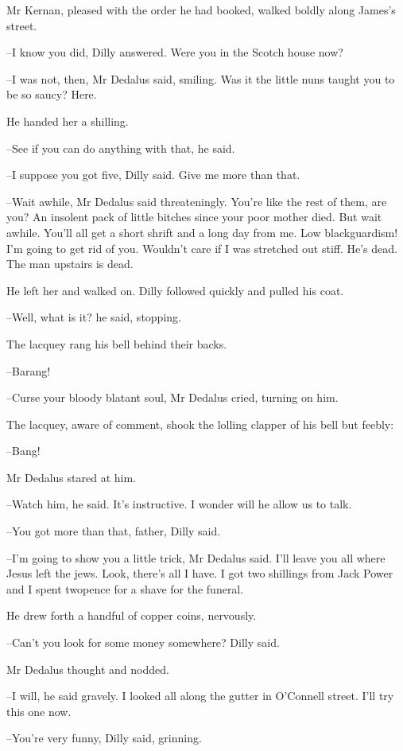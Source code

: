 Mr Kernan,
pleased with the order he had booked,
walked boldly
along James's street.

--I know you did,
Dilly answered.
Were you in the Scotch house now?

--I was not, then,
Mr Dedalus said, smiling.
Was it the little nuns
taught you to be so saucy?
Here.

He handed her a shilling.

--See if you can do anything with that,
he said.

--I suppose you got five,
Dilly said.
Give me more than that.

--Wait awhile,
Mr Dedalus said threateningly.
You're like the rest of
them, are you?
An insolent pack of little bitches since your poor mother
died.
But wait awhile.
You'll all get a short shrift and a long day from
me.
Low blackguardism!
I'm going to get rid of you.
Wouldn't care if I
was stretched out stiff.
He's dead.
The man upstairs is dead.

He left her and walked on.
Dilly followed quickly and pulled his coat.

--Well, what is it?
he said, stopping.

The lacquey rang his bell behind their backs.

--Barang!

--Curse your bloody blatant soul,
Mr Dedalus cried,
turning on him.

The lacquey,
aware of comment,
shook the lolling clapper of his bell
but feebly:

--Bang!

Mr Dedalus stared at him.

--Watch him,
he said.
It's instructive.
I wonder will he allow us to talk.

--You got more than that, father,
Dilly said.

--I'm going to show you a little trick,
Mr Dedalus said.
I'll leave you
all where Jesus left the jews.
Look, there's all I have.
I got two
shillings from Jack Power
and I spent twopence for a shave for the
funeral.

He drew forth a handful of copper coins,
nervously.

--Can't you look for some money somewhere?
Dilly said.

Mr Dedalus thought and nodded.

--I will,
he said gravely.
I looked all along the gutter in O'Connell
street.
I'll try this one now.

--You're very funny,
Dilly said, grinning.

